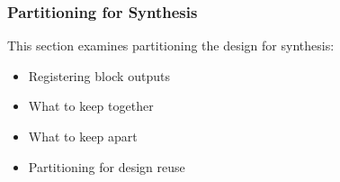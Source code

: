 \documentclass[t, notes, xcolor=table]{beamer}
\begin{document}
\begin{frame}
\frametitle{Partitioning for Synthesis}
This section examines partitioning the design for synthesis:
\begin{itemize}
\item Registering block outputs
\item What to keep together
\item What to keep apart
\item Partitioning for design reuse
\end{itemize}

\end{frame}
\end{document}
